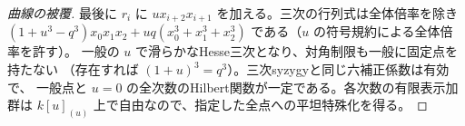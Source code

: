 \begin{proof}[曲線の被覆]
最後に $r_i$ に $u x_{i+2}x_{i+1}$ を加える。三次の行列式は全体倍率を除き
$(1+u^3-q^3)x_0x_1x_2+uq(x_0^3+x_1^3+x_2^3)$ である（$u$ の符号規約による全体倍率を許す）。
一般の $u$ で滑らかなHesse三次となり、対角制限も一般に固定点を持たない
（存在すれば $(1+u)^3=q^3$）。三次syzygyと同じ六補正係数は有効で、
一般点と $u=0$ の全次数のHilbert関数が一定である。各次数の有限表示加群は
$k[u]_{(u)}$ 上で自由なので、指定した全点への平坦特殊化を得る。
\end{proof}
